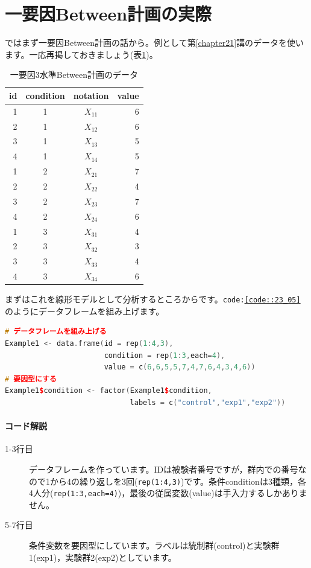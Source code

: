 \documentclass{ltjsarticle}
\begin{document}
\section{一要因Between計画の実際}
ではまず一要因Between計画の話から。例として第\ref{chapter21}講のデータを使います。一応再掲しておきましょう(表\ref{table::23_01})。
\begin{table}[ht]
    \centering
    \caption{一要因3水準Between計画のデータ}
    \begin{tabular}{rccr}
      \hline
    id & condition & notation & value \\ 
      \hline
      1 & 1 & $X_{11}$ & 6 \\ 
      2 & 1 & $X_{12}$ & 6 \\ 
      3 & 1 & $X_{13}$ & 5 \\ 
      4 & 1 & $X_{14}$ & 5 \\ 
      1 & 2 & $X_{21}$ & 7 \\ 
      2 & 2 & $X_{22}$ & 4 \\ 
      3 & 2 & $X_{23}$ & 7 \\ 
      4 & 2 & $X_{24}$ & 6 \\ 
      1 & 3 & $X_{31}$ & 4 \\ 
      2 & 3 & $X_{32}$ & 3 \\ 
      3 & 3 & $X_{33}$ & 4 \\ 
      4 & 3 & $X_{34}$ & 6 \\ 
       \hline
    \end{tabular}
    \label{table::23_01}
    \end{table}
まずはこれを線形モデルとして分析するところからです。\texttt{code:\ref{code::23_05}}のようにデータフレームを組み上げます。

\begin{lstlisting}[language=c++,label={code::23_05},caption={データの準備}]
# データフレームを組み上げる
Example1 <- data.frame(id = rep(1:4,3),
                       condition = rep(1:3,each=4),
                       value = c(6,6,5,5,7,4,7,6,4,3,4,6))
# 要因型にする
Example1$condition <- factor(Example1$condition,
                             labels = c("control","exp1","exp2"))\end{lstlisting}

\paragraph{コード解説}
\begin{description}
    \item[1-3行目] データフレームを作っています。IDは被験者番号ですが，群内での番号なので1から4の繰り返しを3回(\texttt{rep(1:4,3)})です。条件conditionは3種類，各4人分(\texttt{rep(1:3,each=4)})，最後の従属変数(value)は手入力するしかありません。
    \item[5-7行目] 条件変数を要因型にしています。ラベルは統制群(control)と実験群1(exp1)，実験群2(exp2)としています。
\end{description}
\end{document}
